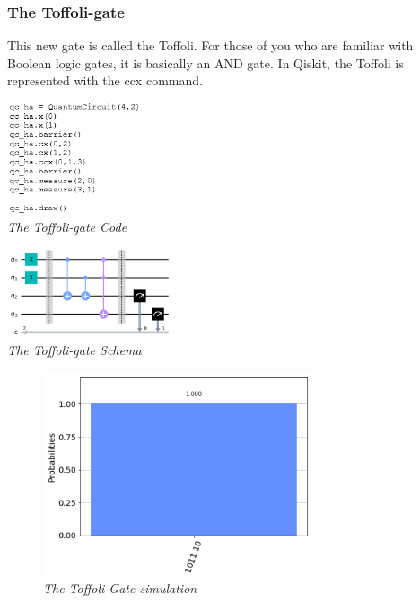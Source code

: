 \documentclass{article}
\begin{document}
\subsubsection{The Toffoli-gate} 
This new gate is called the Toffoli. For those of you who are familiar with Boolean logic gates, it is basically an AND gate.
In Qiskit, the Toffoli is represented with the ccx command.
\begin{mdframed}
\begin{center}
\begin{minipage}[b]{4cm}
\centering
\includegraphics[width=4cm]{toffoli_code.png}\\\textit{The Toffoli-gate Code}
\end{minipage}
\begin{minipage}[b]{5cm}
\centering
\includegraphics[width=5cm]{toffoli_schema.png}\\\textit{The Toffoli-gate Schema}
\end{minipage}
\end{center}
\end{mdframed}
\begin{figure}[h]
\begin{center}
\begin{minipage}[b]{8cm}
\centering
\includegraphics[width=8cm]{toffoli_sym.png}\\\textit{The Toffoli-Gate simulation}
\end{minipage}
\end{center}
\end{figure}
\newpage
\end{document}
